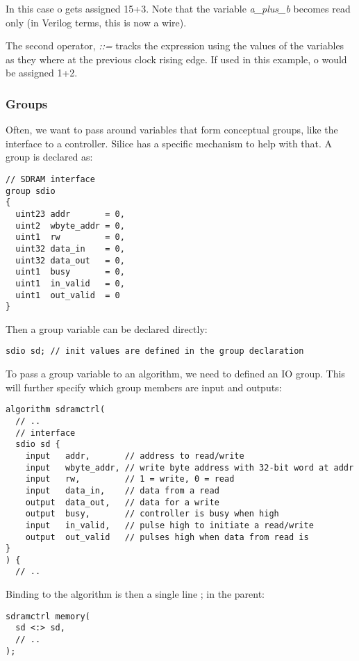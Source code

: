 \documentclass[a4]{article}
\newcommand\silice{Silice}
\begin{document}
In this case o gets assigned 15+3. Note that the variable \textit{a\_plus\_b} becomes read only (in Verilog terms, this is now a wire). 

The second operator, \textit{::=} tracks the expression using the values of the variables as they where at the previous clock rising edge.
If used in this example, o would be assigned 1+2.

\subsubsection{Groups}
\label{sec:groups}

Often, we want to pass around variables that form conceptual groups, like the interface to a controller. \silice{} has a specific mechanism to help with that. A group is declared as:

\begin{verbatim}
// SDRAM interface
group sdio
{
  uint23 addr       = 0,
  uint2  wbyte_addr = 0,
  uint1  rw         = 0,
  uint32 data_in    = 0,
  uint32 data_out   = 0,
  uint1  busy       = 0,
  uint1  in_valid   = 0,
  uint1  out_valid  = 0
}
\end{verbatim}


Then a group variable can be declared directly:
\begin{verbatim}
sdio sd; // init values are defined in the group declaration
\end{verbatim}

To pass a group variable to an algorithm, we need to defined an IO group. This will further specify which group members are input and outputs:

\begin{verbatim}
algorithm sdramctrl(
  // ..
  // interface
  sdio sd {
    input   addr,       // address to read/write
    input   wbyte_addr, // write byte address with 32-bit word at addr
    input   rw,         // 1 = write, 0 = read
    input   data_in,    // data from a read
    output  data_out,   // data for a write
    output  busy,       // controller is busy when high
    input   in_valid,   // pulse high to initiate a read/write
    output  out_valid   // pulses high when data from read is
}    
) {
  // ..
\end{verbatim}

Binding to the algorithm is then a single line ; in the parent:

\begin{verbatim}
sdramctrl memory(
  sd <:> sd,
  // ..
);
\end{verbatim}
\end{document}
